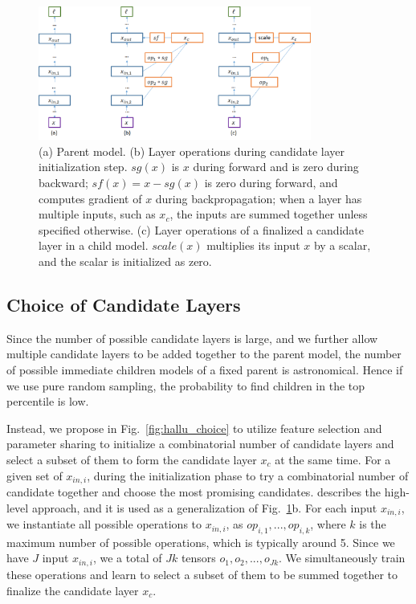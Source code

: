 \documentclass{article}
\begin{document}
\begin{figure}
    \centering
    \includegraphics[keepaspectratio, width=0.8\textwidth]{img/hallu_steps.png}
    \caption{(a) Parent model.
    (b) Layer operations during candidate layer initialization step. $sg(x)$ is $x$ during forward and is zero during backward; $sf(x) = x - sg(x)$ is zero during forward, and computes gradient of $x$ during backpropagation; when a layer has multiple inputs, such as $x_c$, the inputs are summed together unless specified otherwise.
    (c) Layer operations of a finalized a candidate layer in a child model. 
    $scale(x)$ multiplies its input $x$ by a scalar, and the scalar is initialized as zero. }
    \label{fig:hallu_steps}
\end{figure}


\subsection{Choice of Candidate Layers}
\label{sec:hallu_choice}

Since the number of possible candidate layers is large, and we further allow multiple candidate layers to be added together to the parent model, the number of possible immediate children models of a fixed parent is astronomical. 
Hence if we use pure random sampling, the probability to find children in the top percentile is low. 

Instead, we propose in Fig.~\ref{fig:hallu_choice} to utilize feature selection and parameter sharing to initialize a combinatorial number of candidate layers and select a subset of them to form the candidate layer $x_c$ at the same time. For a given set of $x_{in,i}$, during the initialization phase to try a combinatorial number of candidate together and choose the most promising candidates.
 describes the high-level approach, and it is used as a generalization of Fig.~\ref{fig:hallu_steps}b. For each input $x_{in,i}$, we instantiate all possible operations to $x_{in,i}$, as $op_{i,1}, ..., op_{i,k}$, where $k$ is the maximum number of possible operations, which is typically around 5. Since we have $J$ input $x_{in,i}$, we a total of $Jk$ tensors $o_1, o_2, ..., o_{Jk}$. We simultaneously train these operations and learn to select a subset of them to be summed together to finalize the candidate layer $x_c$.
\end{document}
